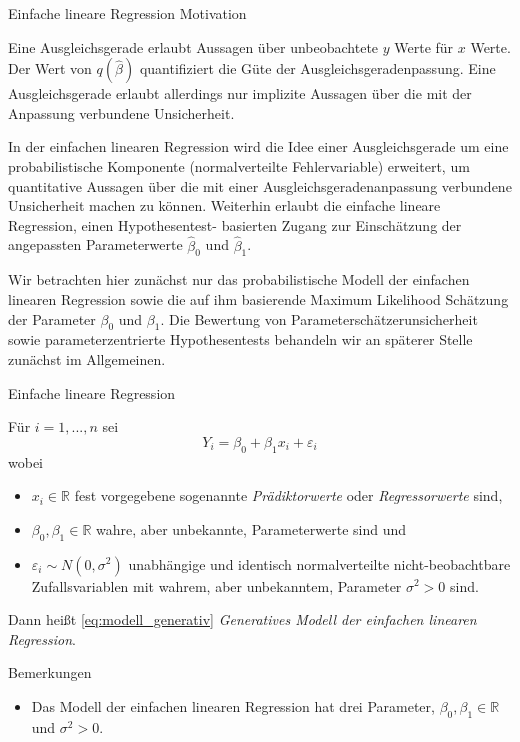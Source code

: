 \documentclass[
  8pt,
  ignorenonframetext,
]{beamer}
\providecommand{\tightlist}{%
  \setlength{\itemsep}{0pt}\setlength{\parskip}{0pt}}
\begin{document}
\begin{frame}{Einfache lineare Regression}
\protect\hypertarget{einfache-lineare-regression}{}
Motivation

\justifying
\small

Eine Ausgleichsgerade erlaubt Aussagen über unbeobachtete \(y\) Werte
für \(x\) Werte. Der Wert von \(q(\hat{\beta})\) quantifiziert die Güte
der Ausgleichsgeradenpassung. Eine Ausgleichsgerade erlaubt allerdings
nur implizite Aussagen über die mit der Anpassung verbundene
Unsicherheit.

In der einfachen linearen Regression wird die Idee einer
Ausgleichsgerade um eine probabilistische Komponente (normalverteilte
Fehlervariable) erweitert, um quantitative Aussagen über die mit einer
Ausgleichsgeradenanpassung verbundene Unsicherheit machen zu können.
Weiterhin erlaubt die einfache lineare Regression, einen Hypothesentest-
basierten Zugang zur Einschätzung der angepassten Parameterwerte
\(\hat{\beta}_0\) und \(\hat{\beta}_1\).

Wir betrachten hier zunächst nur das probabilistische Modell der
einfachen linearen Regression sowie die auf ihm basierende Maximum
Likelihood Schätzung der Parameter \(\beta_0\) und \(\beta_1\). Die
Bewertung von Parameterschätzerunsicherheit sowie parameterzentrierte
Hypothesentests behandeln wir an späterer Stelle zunächst im
Allgemeinen.
\end{frame}

\begin{frame}{Einfache lineare Regression}
\protect\hypertarget{einfache-lineare-regression-1}{}
\small
\begin{definition}
Für $i = 1,...,n$ sei
\begin{equation}\label{eq:modell_generativ}
Y_i = \beta_0 + \beta_1x_i + \varepsilon_{i}
\end{equation}
wobei
\begin{itemize}
\item $x_i \in \mathbb{R}$ fest vorgegebene sogenannte \textit{Prädiktorwerte} oder \textit{Regressorwerte} sind,
\item $\beta_0,\beta_1 \in \mathbb{R}$ wahre, aber unbekannte, Parameterwerte sind und
\item $\varepsilon_{i} \sim N(0,\sigma^2)$ unabhängige und identisch normalverteilte nicht-beobachtbare Zufallsvariablen mit wahrem, aber unbekanntem, Parameter $\sigma^2 > 0$ sind.
\end{itemize}
Dann heißt \eqref{eq:modell_generativ} \textit{Generatives Modell der einfachen linearen Regression}.
\end{definition}

\footnotesize

Bemerkungen

\begin{itemize}
\tightlist
\item
  Das Modell der einfachen linearen Regression hat drei Parameter,
  \(\beta_0,\beta_1 \in \mathbb{R}\) und \(\sigma^2>0\).
\end{itemize}
\end{frame}
\end{document}
